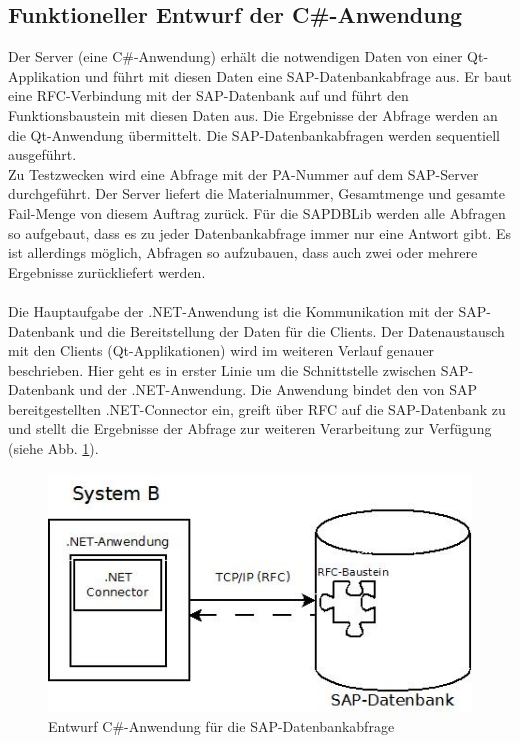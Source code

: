 \subsection{Funktioneller Entwurf der C\#-Anwendung}
Der Server (eine C\#-Anwendung) erhält die notwendigen Daten von einer Qt-Applikation und führt mit diesen Daten eine SAP-Datenbankabfrage aus. Er baut eine RFC-Verbindung mit der SAP-Datenbank auf und führt den Funktionsbaustein mit diesen Daten aus. Die Ergebnisse der Abfrage werden an die Qt-Anwendung übermittelt. Die SAP-Datenbankabfragen werden sequentiell ausgeführt.\\
Zu Testzwecken wird eine Abfrage mit der \ac{PA}-Nummer auf dem SAP-Server durchgeführt. Der Server liefert die Materialnummer, Gesamtmenge und gesamte Fail-Menge von diesem Auftrag zurück. Für die SAPDBLib werden alle Abfragen so aufgebaut, dass es zu jeder Datenbankabfrage immer nur eine Antwort gibt. Es ist allerdings möglich, Abfragen so aufzubauen, dass auch zwei oder mehrere Ergebnisse zurückliefert werden.\\\\
Die Hauptaufgabe der .NET-Anwendung ist die Kommunikation mit der SAP-Datenbank und die Bereitstellung der Daten für die Clients. Der Datenaustausch mit den Clients (Qt-Applikationen) wird im weiteren Verlauf genauer beschrieben. Hier geht es in erster Linie um die Schnittstelle zwischen SAP-Datenbank und der .NET-Anwendung. Die Anwendung bindet den von SAP bereitgestellten .NET-Connector ein, greift über \ac{RFC} auf die SAP-Datenbank zu und stellt die Ergebnisse der Abfrage zur weiteren Verarbeitung zur Verfügung (siehe Abb. \ref{fig:CSharpDetailentwurf}).
\begin{figure}[H]
\centering
\includegraphics[width=0.8\linewidth]{images/CSharpDetailentwurf}
\caption[Entwurf C\#-Anwendung für die SAP-Datenbankabfrage]{Entwurf C\#-Anwendung für die SAP-Datenbankabfrage}
\label{fig:CSharpDetailentwurf}
\end{figure}
